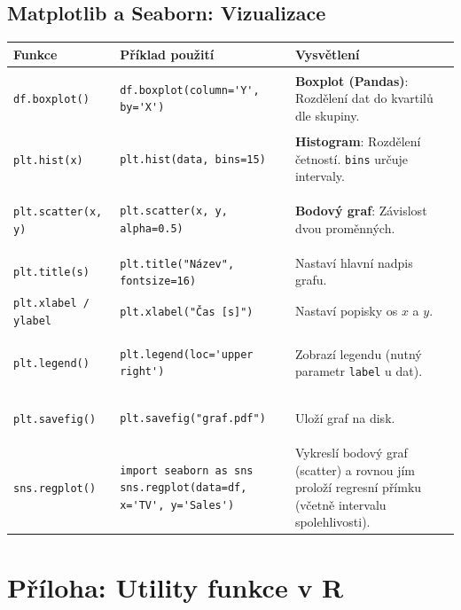 \documentclass[a4paper, 11pt]{article}
\newenvironment{funkcedict}
{%
  \begingroup
  \renewcommand{\arraystretch}{1.4}%
  \lstset{basicstyle=\ttfamily\small, columns=fullflexible}%
  \setlength{\tabcolsep}{4pt}%
  \begin{tabular}{p{0.19\textwidth} p{0.38\textwidth} p{0.30\textwidth}}
  \textbf{Funkce} & \textbf{Příklad použití} & \textbf{Vysvětlení} \\
  \midrule
}
{%
  \end{tabular}%
  \endgroup
}
\begin{document}
			\subsection{Matplotlib a Seaborn: Vizualizace}
			\begin{funkcedict}
				\texttt{df.boxplot()} &
				\begin{lstlisting}
df.boxplot(column='Y', by='X')
				\end{lstlisting}
				& \textbf{Boxplot (Pandas)}: Rozdělení dat do kvartilů dle skupiny. \\
				\texttt{plt.hist(x)} &
				\begin{lstlisting}
plt.hist(data, bins=15)
				\end{lstlisting}
				& \textbf{Histogram}: Rozdělení četností. \texttt{bins} určuje intervaly. \\
				\texttt{plt.scatter(x, y)} &
				\begin{lstlisting}
plt.scatter(x, y, alpha=0.5)
				\end{lstlisting}
				& \textbf{Bodový graf}: Závislost dvou proměnných. \\
				\texttt{plt.title(s)} & \texttt{plt.title("Název", fontsize=16)} & Nastaví hlavní nadpis grafu. \\
				\texttt{plt.xlabel / ylabel} & \texttt{plt.xlabel("Čas [s]")} & Nastaví popisky os $x$ a $y$. \\
				\texttt{plt.legend()} &
				\begin{lstlisting}
plt.legend(loc='upper right')
				\end{lstlisting}
				& Zobrazí legendu (nutný parametr \texttt{label} u dat). \\
				\texttt{plt.savefig()} &
				\begin{lstlisting}
plt.savefig("graf.pdf")
				\end{lstlisting}
				& Uloží graf na disk. \\
				\texttt{sns.regplot()} &
				\begin{lstlisting}
import seaborn as sns
sns.regplot(data=df, x='TV', y='Sales')
				\end{lstlisting}
				& Vykreslí bodový graf (scatter) a rovnou jím proloží regresní přímku (včetně intervalu spolehlivosti). \\
			\end{funkcedict}

			\clearpage
			\section{Příloha: Utility funkce v R}
\end{document}
